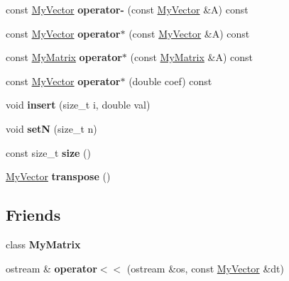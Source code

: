 \begin{DoxyCompactItemize}
\item 
\hypertarget{class_my_vector_a226a639b51eda142c116e3684cb75ad9}{}const \hyperlink{class_my_vector}{My\+Vector} {\bfseries operator-\/} (const \hyperlink{class_my_vector}{My\+Vector} \&A) const \label{class_my_vector_a226a639b51eda142c116e3684cb75ad9}

\item 
\hypertarget{class_my_vector_ae1885282f9006ff0b678119e73d96aaf}{}const \hyperlink{class_my_vector}{My\+Vector} {\bfseries operator$\ast$} (const \hyperlink{class_my_vector}{My\+Vector} \&A) const \label{class_my_vector_ae1885282f9006ff0b678119e73d96aaf}

\item 
\hypertarget{class_my_vector_a20b79b60dda07d0a1896e9038455ffdc}{}const \hyperlink{class_my_matrix}{My\+Matrix} {\bfseries operator$\ast$} (const \hyperlink{class_my_matrix}{My\+Matrix} \&A) const \label{class_my_vector_a20b79b60dda07d0a1896e9038455ffdc}

\item 
\hypertarget{class_my_vector_af1d2f3c5431291a8c93ba896882bccac}{}const \hyperlink{class_my_vector}{My\+Vector} {\bfseries operator$\ast$} (double coef) const \label{class_my_vector_af1d2f3c5431291a8c93ba896882bccac}

\item 
\hypertarget{class_my_vector_ade10742dccbec57b9697ee07fe4395a3}{}void {\bfseries insert} (size\+\_\+t i, double val)\label{class_my_vector_ade10742dccbec57b9697ee07fe4395a3}

\item 
\hypertarget{class_my_vector_a1d14d281af9a60f2ed4846d01afc5165}{}void {\bfseries set\+N} (size\+\_\+t n)\label{class_my_vector_a1d14d281af9a60f2ed4846d01afc5165}

\item 
\hypertarget{class_my_vector_aa333f40c16fb20810e181621367db4d6}{}const size\+\_\+t {\bfseries size} ()\label{class_my_vector_aa333f40c16fb20810e181621367db4d6}

\item 
\hypertarget{class_my_vector_a597542f809ef80fffa72edba7be590c5}{}\hyperlink{class_my_vector}{My\+Vector} {\bfseries transpose} ()\label{class_my_vector_a597542f809ef80fffa72edba7be590c5}

\end{DoxyCompactItemize}
\subsection*{Friends}
\begin{DoxyCompactItemize}
\item 
\hypertarget{class_my_vector_a01f827b255ed7b8f310aa46a561f3bdb}{}class {\bfseries My\+Matrix}\label{class_my_vector_a01f827b255ed7b8f310aa46a561f3bdb}

\item 
\hypertarget{class_my_vector_a75beb9703e00434bf184b384550dbd4c}{}ostream \& {\bfseries operator$<$$<$} (ostream \&os, const \hyperlink{class_my_vector}{My\+Vector} \&dt)\label{class_my_vector_a75beb9703e00434bf184b384550dbd4c}

\end{DoxyCompactItemize}


